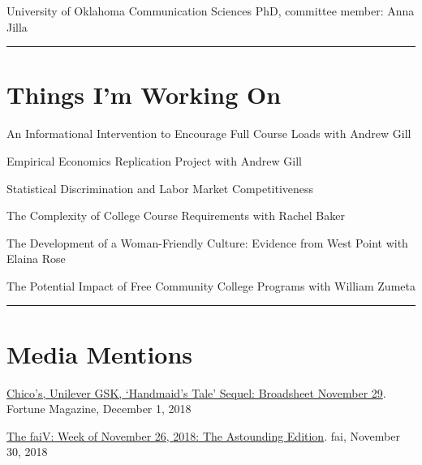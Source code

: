 \documentclass[11pt,a4paper]{article}
\begin{document}
University of Oklahoma Communication Sciences PhD, committee member: Anna Jilla



\vspace{1cm} \hrule \vspace{1cm}





\section*{Things I'm Working On} 



An Informational Intervention to Encourage Full Course Loads with Andrew Gill



Empirical Economics Replication Project with Andrew Gill



Statistical Discrimination and Labor Market Competitiveness



The Complexity of College Course Requirements with Rachel Baker



The Development of a Woman-Friendly Culture: Evidence from West Point with Elaina Rose



The Potential Impact of Free Community College Programs with William Zumeta



\vspace{1cm} \hrule \vspace{1cm}





\section*{Media Mentions} 



\href{http://fortune.com/2018/11/29/chicos-unilever-gsk-handmaids-tale-sequel-broadsheet-november-29/?xid=gn_editorspicks}{Chico's, Unilever GSK, `Handmaid's Tale' Sequel: Broadsheet November 29}. Fortune Magazine, December 1, 2018



\href{https://mailchi.mp/financialaccess/the-faiv-week-of-nov262018}{The faiV: Week of November 26, 2018: The Astounding Edition}. fai, November 30, 2018
\end{document}
